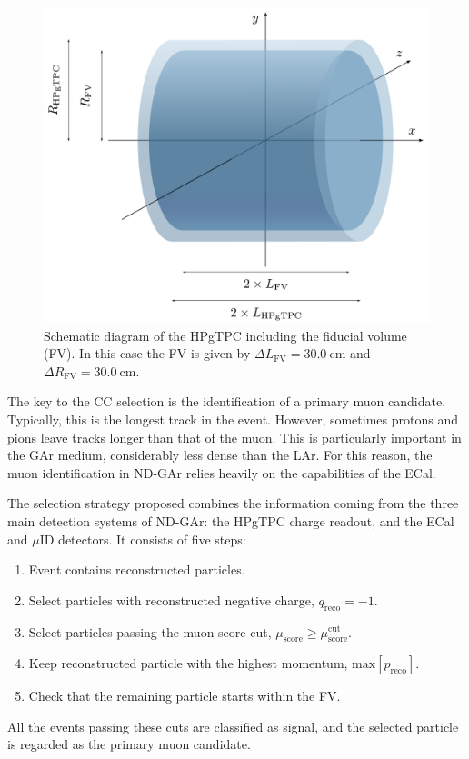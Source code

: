 \begin{figure}[t]
\centering
\includegraphics[width=.90\linewidth]{Images/GAr_selection/ndgar_ana_geometry.pdf}
\caption[Schematic diagram of the HPgTPC including the fiducial volume.]{Schematic diagram of the HPgTPC including the fiducial volume (FV). In this case the FV is given by $\Delta L_{\mathrm{FV}} = 30.0 ~ \mathrm{cm}$ and $\Delta R_{\mathrm{FV}} = 30.0 ~ \mathrm{cm}$.}
\label{fig:ndgar_ana_geometry}
\end{figure}

The key to the CC selection is the identification of a primary muon candidate. Typically, this is the longest track in the event. However, sometimes protons and pions leave tracks longer than that of the muon. This is particularly important in the GAr medium, considerably less dense than the LAr. For this reason, the muon identification in ND-GAr relies heavily on the capabilities of the ECal.

The selection strategy proposed combines the information coming from the three main detection systems of ND-GAr: the HPgTPC charge readout, and the ECal and $\mu$ID detectors. It consists of five steps:
\begin{enumerate}
    \item Event contains reconstructed particles.
    \item Select particles with reconstructed negative charge, $q_{\mathrm{reco}} = -1$.
    \item Select particles passing the muon score cut, $\mu_{\mathrm{score}} \geq \mu_{\mathrm{score}}^{\mathrm{cut}}$.
    \item Keep reconstructed particle with the highest momentum, $\mathrm{max}\left[p_{\mathrm{reco}}\right]$.
    \item Check that the remaining particle starts within the FV.
\end{enumerate}
All the events passing these cuts are classified as signal, and the selected particle is regarded as the primary muon candidate.

